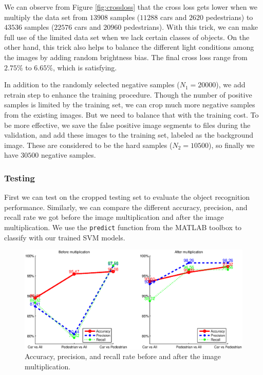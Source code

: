 \documentclass{article} %
\begin{document}
We can observe from Figure \ref{fig:crossloss} that the cross loss gets lower when we multiply the data set from $13908$ samples ($11288$ cars and $2620$ pedestrians) to $43536$ samples ($22576$ cars and $20960$ pedestrians). With this trick, we can make full use of the limited data set when we lack certain classes of objects. On the other hand, this trick also helps to balance the different light conditions among the images by adding random brightness bias. The final cross loss range from $2.75\%$ to $6.65\%$, which is satisfying. 

In addition to the randomly selected negative samples ($N_1=20000$), we add retrain step to enhance the training procedure. Though the number of positive samples is limited by the training set, we can crop much more negative samples from the existing images. But we need to balance that with the training cost. To be more effective, we save the false positive image segments to files during the validation, and add these images to the training set, labeled as the background image. These are considered to be the hard samples ($N_2=10500$), so finally we have $30500$ negative samples.

\subsubsection{Testing}

First we can test on the cropped testing set to evaluate the object recognition performance. Similarly, we can compare the different accuracy, precision, and recall rate we got before the image multiplication and after the image multiplication. We use the \texttt{predict} function from the MATLAB toolbox to classify with our trained SVM models.

\begin{figure}[htb]
\begin{center}
\includegraphics[width=\textwidth]{test_apr.eps}
\end{center}
\caption{Accuracy, precision, and recall rate before and after the image multiplication.
\label{fig:test_apr}}
\end{figure}
\end{document}
